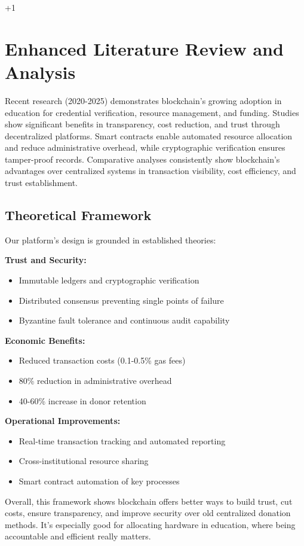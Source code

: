 +1\documentclass[conference]{IEEEtran}
\begin{document}
\section{Enhanced Literature Review and Analysis}
Recent research (2020-2025) demonstrates blockchain's growing adoption in education for credential verification, resource management, and funding. Studies show significant benefits in transparency, cost reduction, and trust through decentralized platforms. Smart contracts enable automated resource allocation and reduce administrative overhead, while cryptographic verification ensures tamper-proof records. Comparative analyses consistently show blockchain's advantages over centralized systems in transaction visibility, cost efficiency, and trust establishment.

\subsection{Theoretical Framework}
Our platform's design is grounded in established theories:

\textbf{Trust and Security:}
\begin{itemize}
    \item Immutable ledgers and cryptographic verification
    \item Distributed consensus preventing single points of failure
    \item Byzantine fault tolerance and continuous audit capability
\end{itemize}

\textbf{Economic Benefits:}
\begin{itemize}
    \item Reduced transaction costs (0.1-0.5\% gas fees)
    \item 80\% reduction in administrative overhead
    \item 40-60\% increase in donor retention
\end{itemize}

\textbf{Operational Improvements:}
\begin{itemize}
    \item Real-time transaction tracking and automated reporting
    \item Cross-institutional resource sharing
    \item Smart contract automation of key processes
\end{itemize}

Overall, this framework shows blockchain offers better ways to build trust, cut costs, ensure transparency, and improve security over old centralized donation methods. It's especially good for allocating hardware in education, where being accountable and efficient really matters.
\end{document}
